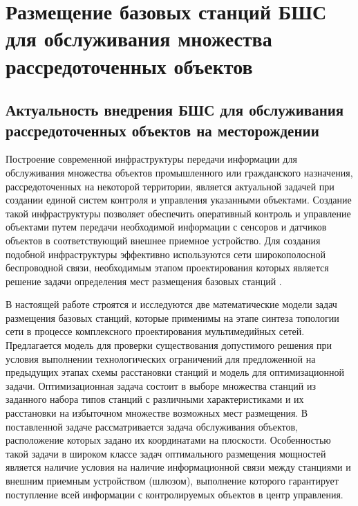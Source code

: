 \chapter{Размещение базовых станций БШС для обслуживания множества рассредоточенных объектов}\label{ch:ch2}

\section{Актуальность внедрения БШС для обслуживания рассредоточенных объектов на месторождении}

Построение современной инфраструктуры передачи информации для обслуживания множества объектов промышленного или гражданского назначения, рассредоточенных на некоторой территории, является актуальной задачей при создании единой систем контроля и управления указанными объектами.  Создание такой инфраструктуры позволяет обеспечить оперативный контроль и управление объектами путем передачи необходимой информации с сенсоров и датчиков объектов в соответствующий внешнее приемное устройство. Для создания подобной инфраструктуры эффективно используются сети широкополосной беспроводной связи, необходимым этапом проектирования которых является решение задачи определения мест размещения базовых станций \cite{VishnevskyBook}.



В настоящей работе строятся и исследуются две математические модели задач размещения базовых станций, которые применимы на этапе синтеза топологии сети в процессе комплексного проектирования мультимедийных сетей. Предлагается модель для проверки существования допустимого решения при условия выполнении технологических ограничений для предложенной на предыдущих этапах схемы расстановки станций и модель для оптимизационной задачи. Оптимизационная задача состоит в выборе множества станций из заданного набора типов станций с различными характеристиками и их расстановки на избыточном множестве возможных мест размещения. В поставленной задаче рассматривается задача обслуживания объектов, расположение которых задано их координатами на плоскости. Особенностью такой задачи в широком классе задач оптимального размещения мощностей является наличие условия на наличие информационной связи между станциями и внешним приемным устройством (шлюзом), выполнение которого гарантирует поступление всей информации с контролируемых объектов в центр управления.

